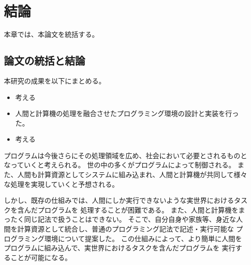 \chapter{結論}\label{chap:conclusion}

本章では、本論文を統括する。

\section{論文の統括と結論}\label{ux8ad6ux6587ux306eux7d71ux62ecux3068ux7d50ux8ad6}

本研究の成果を以下にまとめる。

\begin{itemize}
\itemsep1pt\parskip0pt
\item
  考える
\item
  人間と計算機の処理を融合させたプログラミング環境の設計と実装を行った。
\item
  考える
\end{itemize}

プログラムは今後さらにその処理領域を広め、社会において必要とされるものとなっていくと考えられる。
世の中の多くがプログラムによって制御される。
また、人間も計算資源としてシステムに組み込まれ、人間と計算機が共同して様々な処理を実現していくと予想される。

しかし、既存の仕組みでは、人間にしか実行できないような実世界におけるタスクを含んだプログラムを
処理することが困難である。
また、人間と計算機をまったく同じ記法で扱うことはできない。
そこで、自分自身や家族等、身近な人間を計算資源として統合し、普通のプログラミング記法で記述・実行可能な
プログラミング環境について提案した。
この仕組みによって、より簡単に人間をプログラムに組み込んで、実世界におけるタスクを含んだプログラムを
実行することが可能になる。
